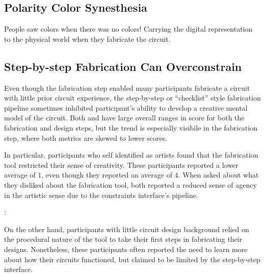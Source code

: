 \documentclass{sigchi}
\begin{document}
  
  \subsection{Polarity Color Synesthesia}
  People saw colors when there was no colors!
  Carrying the digital representation to the physical world when they fabricate the circuit. 

  \subsection{Step-by-step Fabrication Can Overconstrain}

  Even though the fabrication step enabled many participants fabricate a circuit with little prior circuit experience, the step-by-step or ``checklist'' style fabrication pipeline sometimes inhibited participant's ability to develop a creative mental model of the circuit. Both  and  have large overall ranges in score for both the fabrication and design steps, but the trend is especially visibile in the fabrication step, where both  metrics are skewed to lower scores.
  
  In particular, participants who self identified as artists found that the fabrication tool restricted their sense of creativity. These participants reported a lower average  of $1$, even though they reported an average  of $4$. When asked about what they disliked about the fabrication tool, both reported a reduced sense of agency in the artistic sense due to the constraints interface's pipeline.

  \begin{myquote}
   \vspace{-2pt}
    :
    \vspace{-2pt}
  \end{myquote}

  On the other hand, participants with little circuit design background relied on the procedural nature of the tool to take their first steps in fabricating their designs. Nonetheless, these participants often reported the need to learn more about how their circuits functioned, but claimed to be limited by the step-by-step interface.
  
\end{document}
